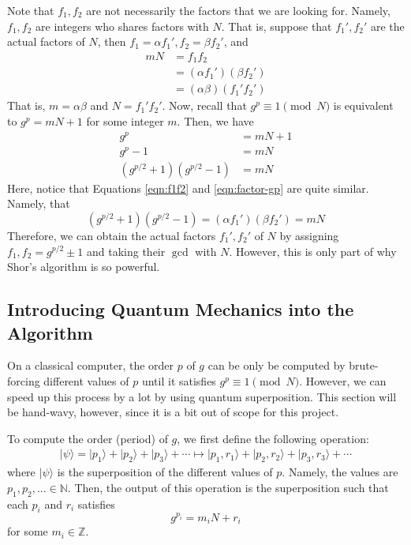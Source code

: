 \documentclass{article}
\begin{document}
Note that \(f_1, f_2\) are not necessarily the factors that we are looking for. Namely, \(f_1, f_2\) are integers who shares factors with \(N\). That is, suppose that \(f_1', f_2'\) are the actual factors of \(N\), then \(f_1 = \alpha f_1', f_2 = \beta f_2'\), and
\begin{equation}\label{eqn:f1f2}
\begin{aligned}
    mN &= f_1 f_2 \\
       &= (\alpha f_1')(\beta f_2') \\
       &= (\alpha\beta)(f_1' f_2')
\end{aligned}
\end{equation}
That is, \(m = \alpha\beta\) and \(N = f_1'f_2'\). Now, recall that \(g^p \equiv 1 \pmod N\) is equivalent to \(g^p = mN + 1\) for some integer \(m\). Then, we have
\begin{equation}\label{eqn:factor-gp}
\begin{aligned}
    g^p &= mN + 1 \\
    g^p - 1 &= mN \\
    (g^{p/2}+1)(g^{p/2}-1) &= mN
\end{aligned}
\end{equation}
Here, notice that Equations \ref{eqn:f1f2} and \ref{eqn:factor-gp} are quite similar. Namely, that
\[
    (g^{p/2}+1)(g^{p/2}-1) = (\alpha f_1')(\beta f_2') = mN
\]
Therefore, we can obtain the actual factors \(f_1', f_2'\) of \(N\) by assigning \(f_1, f_2 = g^{p/2} \pm 1\) and taking their \(\gcd\) with \(N\). However, this is only part of why Shor's algorithm is so powerful.

\subsection{Introducing Quantum Mechanics into the Algorithm}

On a classical computer, the order \(p\) of \(g\) can be only be computed by brute-forcing different values of \(p\) until it satisfies \(g^p \equiv 1 \pmod N\). However, we can speed up this process by a lot by using quantum superposition. This section will be hand-wavy, however, since it is a bit out of scope for this project.

To compute the order (period) of \(g\), we first define the following operation:
\[
\begin{aligned}
    \lvert \psi \rangle = \lvert p_1 \rangle + \lvert p_2 \rangle + \lvert p_3 \rangle + \cdots \mapsto \lvert p_1, r_1 \rangle + \lvert p_2, r_2 \rangle + \lvert p_3, r_3 \rangle + \cdots
\end{aligned}
\]
where \(\lvert \psi \rangle\) is the superposition of the different values of \(p\). Namely, the values are \(p_1, p_2, ... \in \mathbb{N}\). Then, the output of this operation is the superposition such that each \(p_i\) and \(r_i\) satisfies
\[
    g^{p_i} = m_iN + r_i
\]
for some \(m_i \in \mathbb{Z}\).
\end{document}
